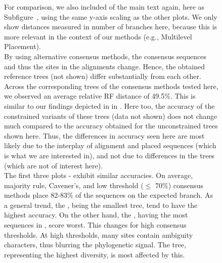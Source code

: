 \begin{figure}[hpbt]
{%
        For comparison, we also included  of the main text again,
        here as Subfigure~,
        using the same y-axis scaling as the other plots.
        We only show distances measured in number of branches here,
        because this is more relevant in the context of our methods (e.g., Multilevel Placement).
        \\
        By using alternative consensus methods, the consensus sequences and thus the sites in the alignments change.
        Hence, the obtained reference trees (not shown) differ substantially from each other.
        Across the corresponding trees of the consensus methods tested here,
        we observed an average relative RF distance of 49.5\%.
        This is similar to our findings depicted in in .
        Here too, the accuracy of the constrained variants of these trees (data not shown)
        does not change much compared to the accuracy obtained for the unconstrained trees shown here.
        Thus, the differences in accuracy seen here are most likely due to
        the interplay of alignment and placed sequences (which is what we are interested in),
        and not due to differences in the trees (which are not of interest here).
        \\
        The first three plots -
        exhibit similar accuracies.
        On average, majority rule, Cavener's, and low threshold ($\leq$ 70\%) consensus methods
        place 82-83\% of the sequences on the expected branch.
        As a general trend, the , being the smallest tree, tend to have the highest accuracy.
        On the other hand, the , having the most sequences in , score worst.
        This changes for high consensus thresholds.
        At high thresholds, many sites contain ambiguity characters, thus blurring the phylogenetic signal.
        The  tree, representing the highest diversity, is most affected by this.
    }
    \label{fig:consensi_backbone}
\end{figure}


